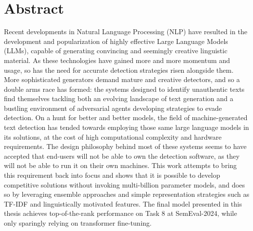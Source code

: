 \section*{Abstract}

Recent developments in Natural Language Processing (NLP) have resulted in the development and popularization of highly effective Large Language Models (LLMs), capable of generating convincing and seemingly creative linguistic material.
As these technologies have gained more and more momentum and usage, so has the need for accurate detection strategies risen alongside them.
More sophisticated generators demand mature and creative detectors, and so a double arms race has formed: the systems designed to identify unauthentic texts find themselves tackling both an evolving landscape of text generation and a bustling environment of adversarial agents developing strategies to evade detection.
On a hunt for better and better models, the field of machine-generated text detection has tended towards employing those same large language models in its solutions, at the cost of high computational complexity and hardware requirements.
The design philosophy behind most of these systems seems to have accepted that end-users will not be able to own the detection software, as they will not be able to run it on their own machines.
This work attempts to bring this requirement back into focus and shows that it is possible to develop competitive solutions without invoking multi-billion parameter models, and does so by leveraging ensemble approaches and simple representation strategies such as TF-IDF and linguistically motivated features.
The final model presented in this thesis achieves top-of-the-rank performance on Task 8 at SemEval-2024, while only sparingly relying on transformer fine-tuning.
